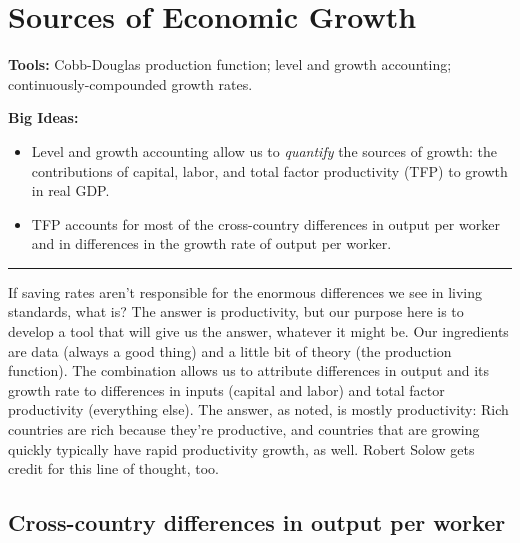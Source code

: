 \chapter{Sources of Economic Growth}\label{chp:grth}
\hypertarget{growth}{}

\textbf{Tools:} Cobb-Douglas production function; level and growth accounting;
continuously-compounded growth rates.

\textbf{Big Ideas:}
\vspace{-0.1in}
\begin{itemize}
\item Level and growth accounting allow us to \emph{quantify} the sources of growth:
  the contributions of capital, labor, and total factor productivity (TFP) to growth in real GDP.
\item TFP accounts for most of the cross-country differences in output per worker 
and in differences in the growth rate of output per worker.
\end{itemize}
\rule{\textwidth}{1pt}

If saving rates aren't responsible for
the enormous differences we see in living standards, what is?
The answer is productivity, but our purpose here is to develop
a tool that will give us the answer, whatever it might be.
Our ingredients are data (always a good thing)
and a little bit of theory (the production function).
The combination allows us to attribute differences in output and its
growth rate to differences in inputs (capital and labor)
and total factor productivity (everything else).
The answer, as noted, is mostly productivity:
Rich countries are rich because they're productive,
and countries that are growing quickly typically
have rapid productivity growth, as well.
Robert Solow gets credit for this line of thought, too.


\section{Cross-country differences in output per worker}


